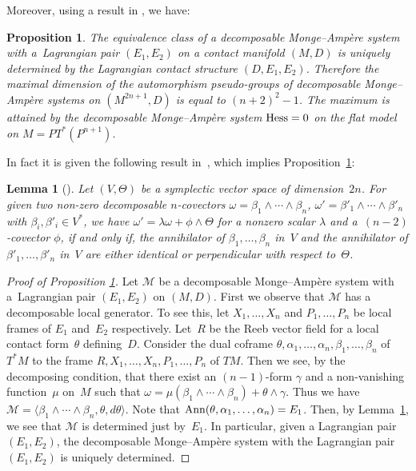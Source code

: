 \documentclass[pdftex]{sigma}
\newtheorem{Prop}[Th]{Proposition}
\newtheorem{Lem}[Th]{Lemma}
{ \theoremstyle{definition}
\newtheorem{Def}[Th]{Definition}
\newtheorem{Rem}[Th]{Remark}
\newtheorem{Ex}[Th]{Example}}
\begin{document}
Moreover, using a result in \cite{M-M}, we have:

\begin{Prop}
\label{Hess=0}
The equivalence class of a decomposable Monge--Amp{\`e}re system
with a~Lag\-rangian pair $(E_1, E_2)$ on a contact manifold $(M, D)$
is uniquely determined by the Lagrangian contact structure
$(D, E_1, E_2)$.
Therefore the maximal dimension of the automorphism pseudo-groups of decomposable Monge--Amp{\`e}re systems
on $(M^{2n+1}, D)$ is equal to $(n+2)^2-1$.
The maximum is attained by the decomposable Monge--Amp{\`e}re system ${\rm Hess} = 0$
on the flat model on $M = PT^*(P^{n+1})$.
\end{Prop}

In fact it is given the following result in~\cite{M-M}, which implies Proposition~\ref{Hess=0}:

\begin{Lem}[]
\label{decomposable-M-M}
Let $(V, \Theta)$ be a symplectic vector space of dimension~$2n$.
For given two non-zero decomposable $n$-covectors $\omega = \beta_1 \wedge \cdots \wedge \beta_n$,
$\omega' = \beta'_1 \wedge \cdots \wedge \beta'_n$
with $\beta_i, \beta'_i \in V^*$,
we have $\omega' = \lambda\omega + \phi\wedge\Theta$ for a nonzero scalar $\lambda$ and a~$(n-2)$-covector $\phi$, if and only if, the annihilator of $\beta_1, \dots, \beta_n$ in~$V$ and
the annihilator of $\beta'_1, \dots, \beta'_n$ in~$V$ are either identical
or perpendicular with respect to~$\Theta$.
\end{Lem}

\begin{proof}[Proof of Proposition \ref{Hess=0}]
Let ${\mathcal M}$ be a decomposable Monge--Amp{\`e}re system
with a~Lag\-rangian pair $(E_1, E_2)$ on $(M, D)$.
First we observe that ${\mathcal M}$ has a decomposable local generator.
To see this, let $X_1, \dots, X_n$ and $P_1, \dots, P_n$ be local frames
of $E_1$ and~$E_2$ respectively.
Let~$R$ be the Reeb vector f\/ield
for a local contact form~$\theta$ def\/ining~$D$.
Consider the dual coframe $\theta, \alpha_1,\dots,\alpha_n, \beta_1,\dots,\beta_n$
of~$T^*M$ to the frame $R, X_1, \dots, X_n, P_1, \dots, P_n$ of $TM$.
Then we see, by the decomposing condition,
that there exist an $(n-1)$-form $\gamma$ and a
non-vanishing function~$\mu$ on~$M$ such that
$\omega = \mu(\beta_1 \wedge \cdots \wedge \beta_n) + \theta\wedge\gamma$.
Thus we have ${\mathcal M} = \langle \beta_1 \wedge \cdots \wedge \beta_n, \theta, d\theta\rangle$.
Note that ${\rm Ann}(\theta, \alpha_1, \dots, \alpha_n) = E_1$.
Then, by Lemma~\ref{decomposable-M-M}, we see that ${\mathcal M}$ is determined just by~$E_1$.
In particular, given a Lagrangian pair $(E_1, E_2)$, the decomposable Monge--Amp{\`e}re system
with the Lagrangian pair $(E_1, E_2)$ is uniquely determined.
\end{proof}
\end{document}
